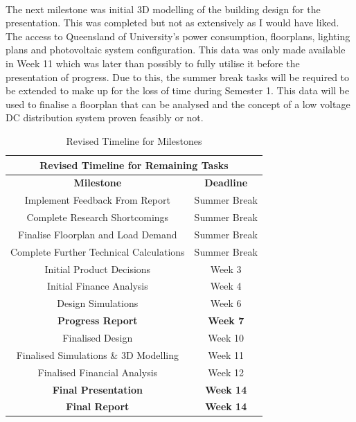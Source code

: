 \paragraph{}
The next milestone was initial 3D modelling of the building design for the presentation. This was completed but not as extensively as I would have liked. The access to Queensland of University's power consumption, floorplans, lighting plans and photovoltaic system configuration. This data was only made available in Week 11 which was later than possibly to fully utilise it before the presentation of progress. Due to this, the summer break tasks will be required to be extended to make up for the loss of time during Semester 1. This data will be used to finalise a floorplan that can be analysed and the concept of a low voltage DC distribution system proven feasibly or not.  

\begin{table}[H]
\centering
\begin{tabular}{||c c||} 
 \hline
 \multicolumn{2}{|c|}{\textbf{Revised Timeline for Remaining Tasks}} \\ \hline\hline
 \textbf{Milestone} & \textbf{Deadline}\\ [0.5ex] 
 \hline\hline
 Implement Feedback From Report & Summer Break  \\
 Complete Research Shortcomings & Summer Break  \\
 Finalise Floorplan and Load Demand & Summer Break  \\
 Complete Further Technical Calculations & Summer Break  \\
 Initial Product Decisions & Week 3  \\
 Initial Finance Analysis & Week 4  \\
 Design Simulations & Week 6  \\ 
 \textbf{Progress Report} & \textbf{Week 7}  \\
 Finalised Design & Week 10  \\
 Finalised Simulations \& 3D Modelling & Week 11  \\
 Finalised Financial Analysis & Week 12  \\ 
 \textbf{Final Presentation} & \textbf{Week 14} \\
 \textbf{Final Report} & \textbf{Week 14} \\ [1ex] 
 \hline
\end{tabular}
\caption{Revised Timeline for Milestones}
\label{table:milestones_3}
\end{table} 

